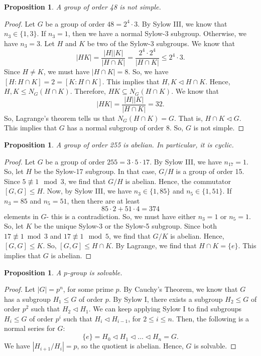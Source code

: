 \documentclass[a4paper, openany]{memoir}
\theoremstyle{definition}
\theoremstyle{plain}
\newtheorem{proposition}[definition]{Proposition}
\begin{document}
    \begin{proposition}
        A group of order 48 is not simple.
    \end{proposition}
    \begin{proof}
        Let $G$ be a group of order $48 = 2^4 \cdot 3$. By Sylow III, we know that $n_3 \in \{1, 3\}$. If $n_3 = 1$, then we have a normal Sylow-$3$ subgroup. Otherwise, we have $n_3 = 3$. Let $H$ and $K$ be two of the Sylow-$3$ subgroups. We know that
        \[|HK| = \frac{|H| |K|}{|H \cap K|} = \frac{2^4 \cdot 2^4}{|H \cap K|} \leq 2^4 \cdot 3.\]
        Since $H \neq K$, we must have $|H \cap K| = 8$. So, we have $[H: H \cap K] = 2 = [K: H \cap K]$. This implies that $H, K \vartriangleleft H \cap K$. Hence, $H, K \leq N_G(H \cap K)$. Therefore, $HK \subseteq N_G(H \cap K)$. We know that
        \[|HK| = \frac{|H| |K|}{|H \cap K|} = 32.\]
        So, Lagrange's theorem tells us that $N_G(H \cap K) = G$. That is, $H \cap K \vartriangleleft G$. This implies that $G$ has a normal subgroup of order $8$. So, $G$ is not simple.
    \end{proof}

    \begin{proposition}
        A group of order 255 is abelian. In particular, it is cyclic.
    \end{proposition}
    \begin{proof}
        Let $G$ be a group of order $255 = 3 \cdot 5 \cdot 17$. By Sylow III, we have $n_{17} = 1$. So, let $H$ be the Sylow-17 subgroup. In that case, $G/H$ is a group of order 15. Since $5 \not\equiv 1 \mod{3}$, we find that $G/H$ is abelian. Hence, the commutator $[G, G] \leq H$. Now, by Sylow III, we have $n_3 \in \{1, 85\}$ and $n_5 \in \{1, 51\}$. If $n_3 = 85$ and $n_5 = 51$, then there are at least
        \[85 \cdot 2 + 51 \cdot 4 = 374\]
        elements in $G$- this is a contradiction. So, we must have either $n_3 = 1$ or $n_5 = 1$. So, let $K$ be the unique Sylow-3 or the Sylow-5 subgroup. Since both $17 \not\equiv 1 \bmod{3}$ and $17 \not\equiv 1 \mod{5}$, we find that $G/K$ is abelian. Hence, $[G, G] \leq K$. So, $[G, G] \leq H \cap K$. By Lagrange, we find that $H \cap K = \{e\}$. This implies that $G$ is abelian.
    \end{proof}

    \begin{proposition}
        A $p$-group is solvable.
    \end{proposition}
    \begin{proof}
        Let $|G| = p^n$, for some prime $p$. By Cauchy's Theorem, we know that $G$ has a subgroup $H_1 \leq G$ of order $p$. By Sylow I, there exists a subgroup $H_2 \leq G$ of order $p^2$ such that $H_2 \vartriangleleft H_1$. We can keep applying Sylow I to find subgroups $H_i \leq G$ of order $p^i$ such that $H_i \vartriangleleft H_{i-1}$, for $2 \leq i \leq n$. Then, the following is a normal series for $G$:
        \[\{e\} = H_0 \vartriangleleft H_1 \vartriangleleft \dots \vartriangleleft H_n = G.\]
        We have $|H_{i+1}/H_i| = p$, so the quotient is abelian. Hence, $G$ is solvable.
    \end{proof}

    
\end{document}
